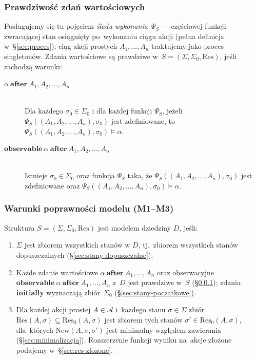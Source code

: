 \documentclass[11pt,a4paper]{article}
\theoremstyle{definition}
\begin{document}
\subsubsection{Prawdziwość zdań wartościowych}
\label{sec:prawdziwosc-zdan-wartosciowych}

Posługujemy się tu pojęciem \emph{śladu wykonania}~$\Psi_S$ --- częściowej funkcji zwracającej stan osiągnięty po~wykonaniu ciągu akcji (pełna definicja w~\S\ref{sec:proces}); ciąg akcji prostych $A_1,\dots,A_n$ traktujemy jako proces singletonów. Zdania wartościowe są prawdziwe w~$S = (\Sigma, \Sigma_0, \mathrm{Res})$, jeśli zachodzą warunki:

\begin{description}
    \item[$\alpha \ \textbf{after} \ A_1, A_2, \dots, A_n$] \hfill \\
        Dla każdego $\sigma_0 \in \Sigma_0$ i dla każdej funkcji $\Psi_S$, jeżeli $\Psi_S((A_1, A_2, \dots, A_n), \sigma_0)$ jest zdefiniowane, to $\Psi_S((A_1, A_2, \dots, A_n), \sigma_0) \models \alpha$.
    \item[$\textbf{observable} \  \alpha \ \textbf{after} \ A_1, A_2, \dots, A_n$] \hfill \\
        Istnieje $\sigma_0 \in \Sigma_0$ oraz funkcja $\Psi_S$ taka, że $\Psi_S((A_1, A_2, \dots, A_n), \sigma_0)$ jest zdefiniowane oraz $\Psi_S((A_1, A_2, \dots, A_n), \sigma_0) \models \alpha$.
\end{description}

\subsubsection{Warunki poprawności modelu (M1--M3)}
\label{sec:model-dziedziny}

Struktura $S = (\Sigma, \Sigma_0, \mathrm{Res})$ jest modelem dziedziny $D$, jeśli:

\begin{enumerate}[label=\textbf{(M\arabic*)}]
    \item $\Sigma$ jest zbiorem wszystkich stanów w $D$, tj.\ zbiorem wszystkich stanów dopuszczalnych (\S\ref{sec:stany-dopuszczalne}).
    \item Każde zdanie wartościowe $\alpha\ \textbf{after}\ A_1,\dots,A_n$ oraz obserwacyjne $\textbf{observable}\ \alpha\ \textbf{after}\ A_1,\dots,A_n$ z~$D$ jest prawdziwe w~$S$ (\S\ref{sec:prawdziwosc-zdan-wartosciowych}); zdania \textbf{initially} wyznaczają zbiór~$\Sigma_0$ (\S\ref{sec:stany-poczatkowe}).
    \item Dla każdej akcji prostej $A \in \mathcal{A}$ i~każdego stanu $\sigma \in \Sigma$ zbiór $\mathrm{Res}(A, \sigma) \subseteq \mathrm{Res}_0(A, \sigma)$ jest zbiorem tych stanów $\sigma' \in \mathrm{Res}_0(A, \sigma)$, dla~których $\mathrm{New}(A, \sigma, \sigma')$ jest minimalny względem zawierania (\S\ref{sec:minimalizacja}). Rozszerzenie funkcji wyniku na~akcje złożone podajemy w~\S\ref{sec:res-zlozone}.
\end{enumerate}
\end{document}
